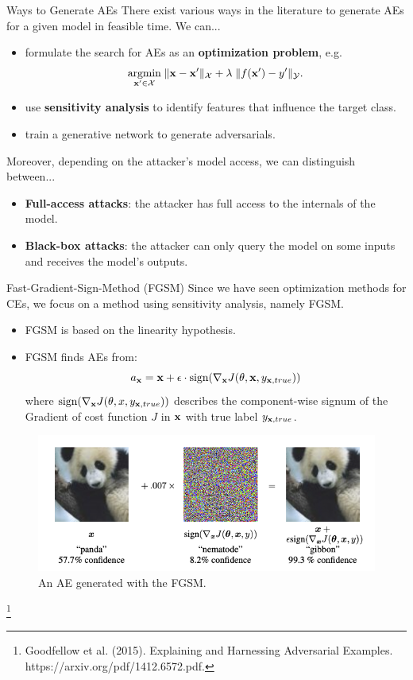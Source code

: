 \documentclass[11pt,compress,t,notes=noshow, aspectratio=169, xcolor=table]{beamer}
\begin{document}
\begin{vbframe}{Ways to Generate AEs}
There exist various ways in the literature to generate AEs for a given model in feasible time. We can...
\begin{itemize}
    \item formulate the search for AEs as an \textbf{optimization problem}, e.g. 
    \begin{equation*}
        \label{eq:optimization}
        \underset{\xv'\in \Xspace}{\text{argmin}}\; \| \xv-\xv' \|_{\Xspace}+\lambda\;    \|f(\xv')-y'\|_{\Yspace}.
    \end{equation*}
    \item use \textbf{sensitivity analysis} to identify features that influence the target class.
    \item train a generative network to generate adversarials.
\end{itemize}
Moreover, depending on the attacker's model access, we can distinguish between...
\begin{itemize}
    \item \textbf{Full-access attacks}: the attacker has full access to the internals of the model.
    \item \textbf{Black-box attacks}: the attacker can only query the model on some inputs and receives the model's outputs.
\end{itemize}
\end{vbframe}

\begin{vbframe}{Fast-Gradient-Sign-Method (FGSM)}
Since we have seen optimization methods for CEs, we focus on a method using sensitivity analysis, namely FGSM.
\begin{itemize}
    \item FGSM is based on the linearity hypothesis.
    \item FGSM finds AEs from:
    \begin{equation*}
        a_{\xv}=\xv+\epsilon\cdot\text{sign}(\nabla_{\xv} J(\theta,\xv,y_{\xv,true}))
    \end{equation*}
    where $\text{sign}(\nabla_{\xv} J(\theta,x,y_{\xv,true}))$ describes the component-wise signum of the Gradient of cost function $J$ in $\xv$ with true label $y_{\xv,true}$.
\end{itemize}
\begin{figure}[h]
\centering
\includegraphics[width=0.5\linewidth]{figure/AEpanda.png}
  \caption{An AE generated with the FGSM.}
  \label{fig:mnist}
\end{figure} 
\vspace{-0.6cm}
\footnote[frame]{Goodfellow et al. (2015). Explaining and Harnessing Adversarial Examples. https://arxiv.org/pdf/1412.6572.pdf.}
\end{vbframe}
\end{document}
